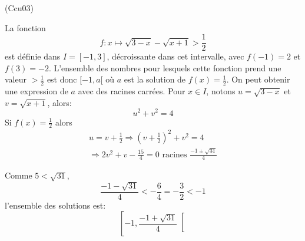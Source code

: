\begin{tiny}(Ccu03)\end{tiny} La fonction
\begin{displaymath}
  f : x \mapsto \sqrt{3-x}-\sqrt{x+1}>\frac{1}{2}
\end{displaymath}
est définie dans $I=[-1,3]$, décroissante dans cet intervalle, avec $f(-1)=2$ et $f(3)=-2$. L'ensemble des nombres pour lesquels cette fonction prend une valeur $>\frac{1}{2}$ est donc $[-1,a[$ où $a$ est la solution de $f(x)=\frac{1}{2}$.\newline
On peut obtenir une expression de $a$ avec des racines carrées.\newline
Pour $x\in I$, notons $u=\sqrt{3-x}$ et $v=\sqrt{x+1}$, alors:
\begin{displaymath}
  u^2 + v^2 = 4
\end{displaymath}
Si $f(x)=\frac{1}{2}$ alors
\begin{multline*}
  u = v + \frac{1}{2} \Rightarrow
  (v + \frac{1}{2})^2+v^2 = 4 \\
  \Rightarrow 2v^2 + v -\frac{15}{4} = 0
  \text{ racines }
  \frac{-1 \pm \sqrt{31}}{4}
\end{multline*}

Comme $5<\sqrt{31}$,
\begin{displaymath}
  \frac{-1-\sqrt{31}}{4}< -\frac{6}{4}=-\frac{3}{2}<-1
\end{displaymath}
l'ensemble des solutions est:
\begin{displaymath}
  \left[ -1, \frac{-1+\sqrt{31}}{4}\right[ 
\end{displaymath}
